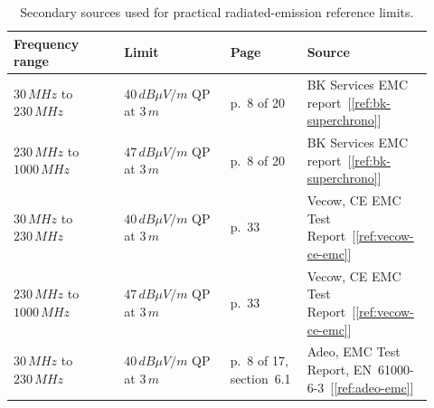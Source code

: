 \begin{table}[H]
\centering
\caption{Secondary sources used for practical radiated-emission reference limits.}
\small
\setlength{\tabcolsep}{4pt}
\begin{tabular}{@{}p{0.25\linewidth}p{0.24\linewidth}p{0.16\linewidth}p{0.27\linewidth}@{}}
\hline
{\raggedright\textbf{Frequency range}\par} &
{\raggedright\textbf{Limit}\par} &
{\raggedright\textbf{Page}\par} &
{\raggedright\textbf{Source}\par} \\
\hline

{\raggedright \(30\,MHz\) to \(230\,MHz\)\par} &
{\raggedright \(40\,dB\mu V/m\) QP at \(3\,m\)\par} &
{\raggedright p.~8 of 20\par} &
{\raggedright BK Services EMC report~[\ref{ref:bk-superchrono}]\par} \\

{\raggedright \(230\,MHz\) to \(1000\,MHz\)\par} &
{\raggedright \(47\,dB\mu V/m\) QP at \(3\,m\)\par} &
{\raggedright p.~8 of 20\par} &
{\raggedright BK Services EMC report~[\ref{ref:bk-superchrono}]\par} \\

{\raggedright \(30\,MHz\) to \(230\,MHz\)\par} &
{\raggedright \(40\,dB\mu V/m\) QP at \(3\,m\)\par} &
{\raggedright p.~33\par} &
{\raggedright Vecow, CE EMC Test Report~[\ref{ref:vecow-ce-emc}]\par} \\

{\raggedright \(230\,MHz\) to \(1000\,MHz\)\par} &
{\raggedright \(47\,dB\mu V/m\) QP at \(3\,m\)\par} &
{\raggedright p.~33\par} &
{\raggedright Vecow, CE EMC Test Report~[\ref{ref:vecow-ce-emc}]\par} \\

{\raggedright \(30\,MHz\) to \(230\,MHz\)\par} &
{\raggedright \(40\,dB\mu V/m\) QP at \(3\,m\)\par} &
{\raggedright p.~8 of 17, section~6.1\par} &
{\raggedright Adeo, EMC Test Report, EN~61000-6-3~[\ref{ref:adeo-emc}]\par} \\


\end{tabular}
\end{table}
